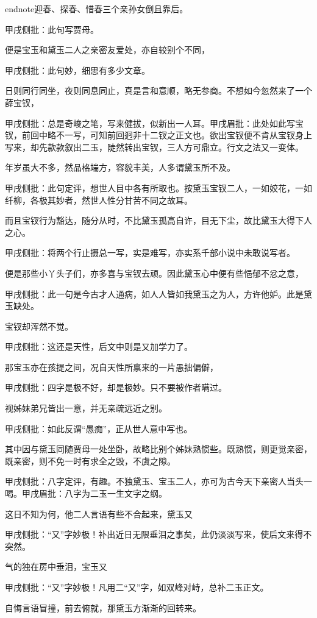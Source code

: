 \begin{parag}
end{note}迎春、探春、惜春三个亲孙女倒且靠后。\begin{note}甲戌侧批：此句写贾母。\end{note}便是宝玉和黛玉二人之亲密友爱处，亦自较别个不同，\begin{note}甲戌侧批：此句妙，细思有多少文章。\end{note}日则同行同坐，夜则同息同止，真是言和意顺，略无参商。不想如今忽然来了一个薛宝钗，\begin{note}甲戌侧批：总是奇峻之笔，写来健拔，似新出一人耳。甲戌眉批：此处如此写宝钗，前回中略不一写，可知前回迥非十二钗之正文也。欲出宝钗便不肯从宝钗身上写来，却先款款叙出二玉，陡然转出宝钗，三人方可鼎立。行文之法又一变体。\end{note}年岁虽大不多，然品格端方，容貌丰美，人多谓黛玉所不及。\begin{note}甲戌侧批：此句定评，想世人目中各有所取也。按黛玉宝钗二人，一如姣花，一如纤柳，各极其妙者，然世人性分甘苦不同之故耳。\end{note}而且宝钗行为豁达，随分从时，不比黛玉孤高自许，目无下尘，故比黛玉大得下人之心。\begin{note}甲戌侧批：将两个行止摄总一写，实是难写，亦实系千部小说中未敢说写者。\end{note}便是那些小丫头子们，亦多喜与宝钗去顽。因此黛玉心中便有些悒郁不忿之意，\begin{note}甲戌侧批：此一句是今古才人通病，如人人皆如我黛玉之为人，方许他妒。此是黛玉缺处。\end{note}宝钗却浑然不觉。\begin{note}甲戌侧批：这还是天性，后文中则是又加学力了。\end{note}那宝玉亦在孩提之间，况自天性所禀来的一片愚拙偏僻，\begin{note}甲戌侧批：四字是极不好，却是极妙。只不要被作者瞒过。\end{note}视姊妹弟兄皆出一意，并无亲疏远近之别。\begin{note}甲戌侧批：如此反谓“愚痴”，正从世人意中写也。\end{note}其中因与黛玉同随贾母一处坐卧，故略比别个姊妹熟惯些。既熟惯，则更觉亲密，既亲密，则不免一时有求全之毁，不虞之隙。\begin{note}甲戌侧批：八字定评，有趣。不独黛玉、宝玉二人，亦可为古今天下亲密人当头一喝。甲戌眉批：八字为二玉一生文字之纲。\end{note}这日不知为何，他二人言语有些不合起来，黛玉又\begin{note}甲戌侧批：“又”字妙极！补出近日无限垂泪之事矣，此仍淡淡写来，使后文来得不突然。\end{note}气的独在房中垂泪，宝玉又\begin{note}甲戌侧批：“又”字妙极！凡用二“又”字，如双峰对峙，总补二玉正文。\end{note}自悔言语冒撞，前去俯就，那黛玉方渐渐的回转来。
\end{parag}


